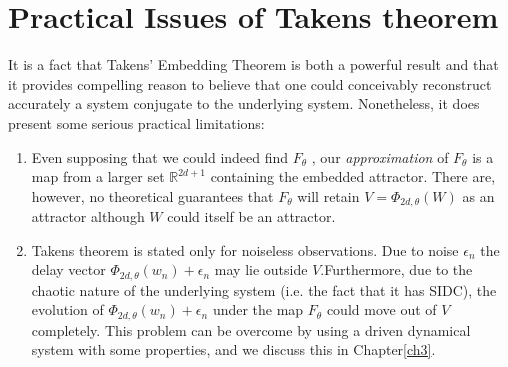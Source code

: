 \documentclass[a4paper,12pt,twoside]{report}
\begin{document}

\section{Practical Issues of Takens theorem}

It is a fact that Takens' Embedding Theorem is both a powerful result and that it provides compelling reason to believe that one could conceivably reconstruct accurately a system conjugate to the underlying system. Nonetheless, it does present some serious practical limitations:
\vspace{-5mm}
\begin{enumerate}
\item Even supposing that we could indeed find $F_\theta$ , our \emph{approximation} of  $F_\theta$ is a map from a larger set $\mathbb{R}^{2d+1}$ containing the embedded attractor. There are, however, no theoretical guarantees that $F_\theta$ will retain  $V=\Phi_{2d,\theta}(W)$  as an attractor although $W$ could itself be an attractor.
\item Takens theorem is stated only for noiseless observations. Due to noise $\epsilon_n$ the delay vector $\Phi_{2d,\theta}(w_n) + \epsilon_n$  may lie outside $V$.Furthermore, due to the chaotic nature of the underlying system (i.e. the fact that it has SIDC), the evolution of $\Phi_{2d,\theta}(w_n) + \epsilon_n$ under the map $F_\theta$ could move out of $V$ completely. This problem can be overcome  by using a driven dynamical system with some properties, and we discuss this in Chapter\ref{ch3}. 
\end{enumerate}


\end{document}
